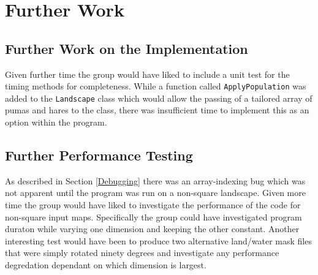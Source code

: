 \section{Further Work}
\label{Further Work}

\subsection{Further Work on the Implementation}
Given further time the group would have liked to include a unit test for the timing methods for completeness.
While a function called \texttt{ApplyPopulation} was added to the \texttt{Landscape} class which would allow the passing of a tailored array of pumas and hares to the class, there was insufficient time to implement this as an option within the program. 

\subsection{Further Performance Testing}

As described in Section \ref{Debugging} there was an array-indexing bug which was not apparent until the program was run on a non-square landscape. 
Given more time the group would have liked to investigate the performance of the code for non-square input maps.
Specifically the group could have investigated program duraton while varying one dimension and keeping the other constant. 
Another interesting test would have been to produce two alternative land/water mask files that were simply rotated ninety degrees and investigate any performance degredation dependant on which dimension is largest. 



 
